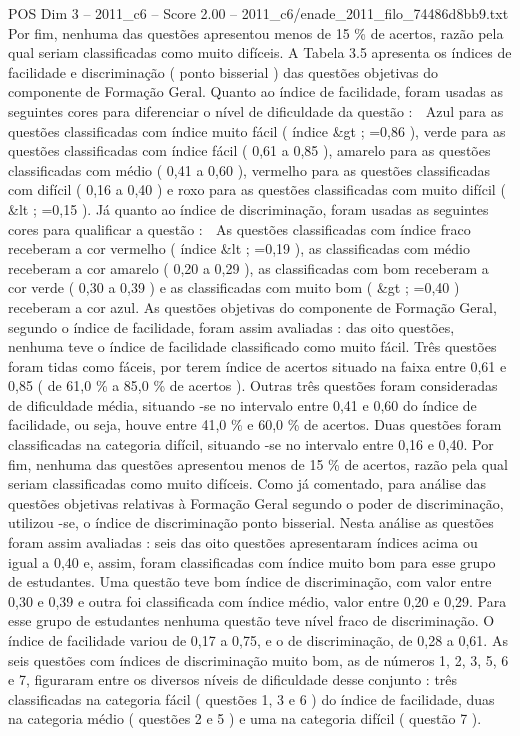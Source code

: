 \begin{textsample}{POS Dim 3 – 2011\_c6 – Score 2.00 – 2011\_c6/enade\_2011\_filo\_74486d8bb9.txt}
Por fim, nenhuma das questões apresentou menos de 15 \% de acertos, razão pela qual seriam classificadas como muito difíceis.
A Tabela 3.5 apresenta os índices de facilidade e discriminação ( ponto bisserial ) das questões objetivas do componente de Formação Geral.
Quanto ao índice de facilidade, foram usadas as seguintes cores para diferenciar o nível de dificuldade da questão :  Azul para as questões classificadas com índice muito fácil ( índice \&gt ; =0,86 ), verde para as questões classificadas com índice fácil ( 0,61 a 0,85 ), amarelo para as questões classificadas com médio ( 0,41 a 0,60 ), vermelho para as questões classificadas com difícil ( 0,16 a 0,40 ) e roxo para as questões classificadas com muito difícil ( \&lt ; =0,15 ).
Já quanto ao índice de discriminação, foram usadas as seguintes cores para qualificar a questão :  As questões classificadas com índice fraco receberam a cor vermelho ( índice \&lt ; =0,19 ), as classificadas com médio receberam a cor amarelo ( 0,20 a 0,29 ), as classificadas com bom receberam a cor verde ( 0,30 a 0,39 ) e as classificadas com muito bom ( \&gt ; =0,40 ) receberam a cor azul.
As questões objetivas do componente de Formação Geral, segundo o índice de facilidade, foram assim avaliadas : das oito questões, nenhuma teve o índice de facilidade classificado como muito fácil.
Três questões foram tidas como fáceis, por terem índice de acertos situado na faixa entre 0,61 e 0,85 ( de 61,0 \% a 85,0 \% de acertos ).
Outras três questões foram consideradas de dificuldade média, situando -se no intervalo entre 0,41 e 0,60 do índice de facilidade, ou seja, houve entre 41,0 \% e 60,0 \% de acertos.
Duas questões foram classificadas na categoria difícil, situando -se no intervalo entre 0,16 e 0,40.
Por fim, nenhuma das questões apresentou menos de 15 \% de acertos, razão pela qual seriam classificadas como muito difíceis.
Como já comentado, para análise das questões objetivas relativas à Formação Geral segundo o poder de discriminação, utilizou -se, o índice de discriminação ponto bisserial.
Nesta análise as questões foram assim avaliadas : seis das oito questões apresentaram índices acima ou igual a 0,40 e, assim, foram classificadas com índice muito bom para esse grupo de estudantes.
Uma questão teve bom índice de discriminação, com valor entre 0,30 e 0,39 e outra foi classificada com índice médio, valor entre 0,20 e 0,29.
Para esse grupo de estudantes nenhuma questão teve nível fraco de discriminação.
O índice de facilidade variou de 0,17 a 0,75, e o de discriminação, de 0,28 a 0,61.
As seis questões com índices de discriminação muito bom, as de números 1, 2, 3, 5, 6 e 7, figuraram entre os diversos níveis de dificuldade desse conjunto : três classificadas na categoria fácil ( questões 1, 3 e 6 ) do índice de facilidade, duas na categoria médio ( questões 2 e 5 ) e uma na categoria difícil ( questão 7 ).

\end{textsample}

